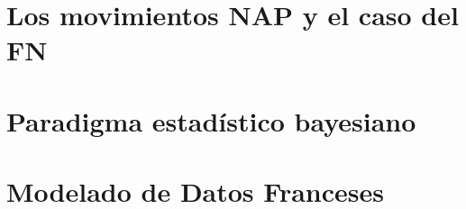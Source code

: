 \documentclass[oneside,10pt,review,usenames,dvipsnames]{book}
\theoremstyle{definition}
\begin{document}

\frontmatter











\tableofcontents




\mainmatter 

\pagestyle{fancy}
	\fancyhf{}
	\rhead{\thepage}
	\fancyhead[L]{\nouppercase{\leftmark}}

\part{Los movimientos NAP y el caso del FN} 
	
	
	
	

\part{Paradigma estadístico bayesiano}

	
	
	

\part{Modelado de Datos Franceses}
	
	


\appendix
\end{document}
